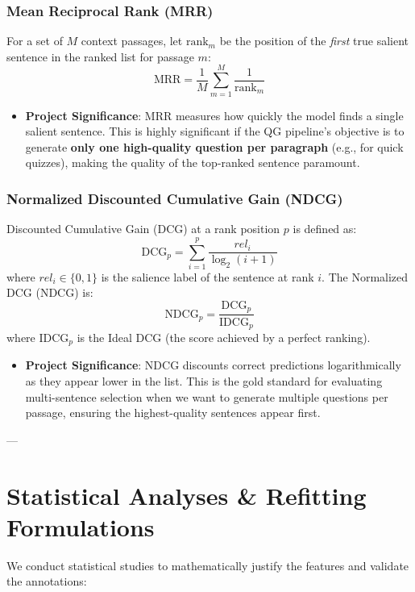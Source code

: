 \documentclass[11pt,a4paper]{article}
\begin{document}
\subsubsection{Mean Reciprocal Rank (MRR)}
For a set of $M$ context passages, let $\text{rank}_m$ be the position of the \textit{first} true salient sentence in the ranked list for passage $m$:
\[
\text{MRR} = \frac{1}{M} \sum_{m=1}^M \frac{1}{\text{rank}_m}
\]
\begin{itemize}
    \item \textbf{Project Significance}: MRR measures how quickly the model finds a single salient sentence. This is highly significant if the QG pipeline's objective is to generate \textbf{only one high-quality question per paragraph} (e.g., for quick quizzes), making the quality of the top-ranked sentence paramount.
\end{itemize}

\subsubsection{Normalized Discounted Cumulative Gain (NDCG)}
Discounted Cumulative Gain (DCG) at a rank position $p$ is defined as:
\[
\text{DCG}_p = \sum_{i=1}^p \frac{rel_i}{\log_2(i + 1)}
\]
where $rel_i \in \{0, 1\}$ is the salience label of the sentence at rank $i$. The Normalized DCG (NDCG) is:
\[
\text{NDCG}_p = \frac{\text{DCG}_p}{\text{IDCG}_p}
\]
where $\text{IDCG}_p$ is the Ideal DCG (the score achieved by a perfect ranking).
\begin{itemize}
    \item \textbf{Project Significance}: NDCG discounts correct predictions logarithmically as they appear lower in the list. This is the gold standard for evaluating multi-sentence selection when we want to generate multiple questions per passage, ensuring the highest-quality sentences appear first.
\end{itemize}

---

\section{Statistical Analyses \& Refitting Formulations}

We conduct statistical studies to mathematically justify the features and validate the annotations:
\end{document}
